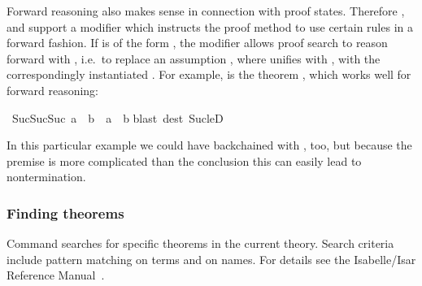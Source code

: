\begin{isabellebody}
\begin{isamarkuptext}
Forward reasoning also makes sense in connection with proof states.
Therefore ,  and  support a modifier
 which instructs the proof method to use certain rules in a
forward fashion. If  is of the form \mbox{}, the modifier
\mbox{}
allows proof search to reason forward with , i.e.\
to replace an assumption , where  unifies with ,
with the correspondingly instantiated \isa{B}. For example, \isa{Suc{\isaliteral{5F}{\isacharunderscore}}leD} is the theorem \mbox{}, which works well for forward reasoning:%
\end{isamarkuptext}%
\isamarkuptrue%
\isamarkupfalse%
\ {}Suc{}Suc{}Suc\ a{}{}\ {}\ b\ {}\ a\ {}\ b{}\isanewline
%
\isadelimproof
%
\endisadelimproof
%
\isatagproof
{}\isamarkupfalse%
{}blast\ dest{}\ Suc{}leD{}%
\endisatagproof
{\isafoldproof}%
%
\isadelimproof
%
\endisadelimproof
%
\begin{isamarkuptext}%
In this particular example we could have backchained with
, too, but because the premise is more complicated than the conclusion this can easily lead to nontermination.

\subsubsection{Finding theorems}

Command  searches for specific theorems in the current
theory. Search criteria include pattern matching on terms and on names.
For details see the Isabelle/Isar Reference Manual~\cite{IsarRef}.
\bigskip


\end{isamarkuptext}
\end{isabellebody}
